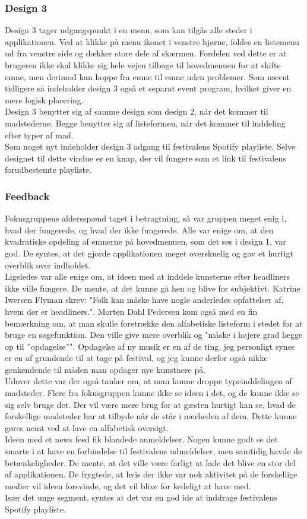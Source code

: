 \documentclass[a4paper,10pt,titlepage]{article}
\begin{document}
\subsubsection{Design 3}
Design 3 tager udgangspunkt i en menu, som kan tilgås alle steder i applikationen. Ved at klikke på menu ikonet i venstre hjørne, foldes en listemenu ud fra venstre side og dækker store dele af skærmen. Fordelen ved dette er at brugeren ikke skal klikke sig hele vejen tilbage til hovedmenuen for at skifte emne, men derimod kan hoppe fra emne til emne uden problemer. Som nævnt tidligere så indeholder design 3 også et separat event program, hvilket giver en mere logisk placering.\\
Design 3 benytter sig af samme design som design 2, når det kommer til madstederne. Begge benytter sig af listeformen, når det kommer til inddeling efter typer af mad.\\
Som noget nyt indeholder design 3 adgang til festivalens Spotify playliste. Selve designet til dette vindue er en knap, der vil fungere som et link til festivalens forudbestemte playliste.
\subsubsection{Feedback}
Fokusgruppens aldersspænd taget i betragtning, så var gruppen meget enig i, hvad der fungerede, og hvad der ikke fungerede. Alle var enige om, at den kvadratiske opdeling af emnerne på hovedmenuen, som det ses i design 1, var god. De syntes, at det gjorde applikationen meget overskuelig og gav et hurtigt overblik over indholdet.\\ 
Ligeledes var alle enige om, at ideen med at inddele kunsterne efter headliners ikke ville fungere. De mente, at det kunne gå hen og blive for subjektivt. Katrine Iwersen Flyman skrev: "Folk kan måske have nogle anderledes opfattelser af, hvem der er headliners.". Morten Dahl Pedersen kom også med en fin bemærkning om, at man skulle foretrække den alfabetiske listeform i stedet for at bruge en søgefunktion. Den ville give mere overblik og "måske i højere grad lægge op til ”opdagelse”". Opdagelse af ny musik er en af de ting, jeg personligt synes er en af grundende til at tage på festival, og jeg kunne derfor også nikke genkendende til måden man opdager nye kunstnere på.\\
Udover dette var der også tanker om, at man kunne droppe typeinddelingen af madsteder. Flere fra fokusgruppen kunne ikke se ideen i det, og de kunne ikke se sig selv bruge det. Der vil være mere brug for at gæsten hurtigt kan se, hvad de forskellige madsteder har at tilbyde når de står i nærheden af dem. Dette kunne gøres nemt ved at lave en alfabetisk oversigt.\\
Ideen med et news feed fik blandede anmeldelser. Nogen kunne godt se det smarte i at have en forbindelse til festivalens udmeldelser, men samtidig havde de betænkeligheder. De mente, at det ville være farligt at lade det blive en stor del af applikationen. De frygtede, at hvis der ikke var nok aktivitet på de forskellige medier vil ideen forsvinde, og det vil blive for kedeligt at have med.\\
Især det unge segment, syntes at det var en god ide at inddrage festivalens Spotify playliste.
\end{document}
